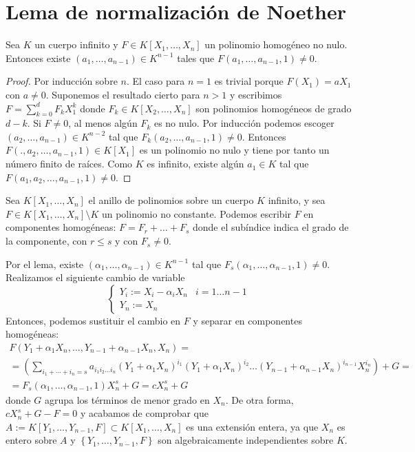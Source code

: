 \documentclass[../main.tex]{subfiles}
\begin{document}
\section{Lema de normalización de Noether}
\begin{lemma}
Sea $K$ un cuerpo infinito y $F\in K[X_1, \dots, X_n]$ un polinomio homogéneo no nulo. Entonces existe $(a_1, \dots, a_{n-1}) \in K^{n-1}$ tales que $F(a_1, \dots, a_{n-1},1)\neq 0$.
\end{lemma}
\begin{proof}
Por inducción sobre $n$. El caso para $n=1$ es trivial porque $F(X_1) = aX_1$ con $a\neq 0$. Suponemos el resultado cierto para $n>1$ y escribimos $F = \sum_{k=0}^d F_k X_1^k$ donde $F_k \in K[X_2,\dots, X_n]$ son polinomios homogéneos de grado $d-k$.  Si $F\neq 0$, al menos algún $F_k$ es no nulo.
Por inducción podemos escoger $(a_2, \dots, a_{n-1}) \in K^{n-2}$ tal que $F_k(a_2, \dots, a_{n-1},1)\neq 0$. Entonces $F(.,a_2, \dots, a_{n-1},1) \in K[X_1]$ es un polinomio no nulo y tiene por tanto un número finito de raíces. Como $K$ es infinito, existe algún $a_1 \in K$ tal que $F(a_1,a_2, \dots, a_{n-1},1) \neq 0$.
\end{proof}
\begin{remark}\label{obs_import}
Sea $K\left[X_{1}, \ldots, X_{n}\right]$ el anillo de polinomios sobre un cuerpo $K$ infinito,  y sea $F \in K\left[X_{1}, \ldots, X_{n}\right] \setminus K$ un polinomio no constante. Podemos escribir $F$ en componentes homogéneas: $F=F_{r}+\ldots+F_{s}$ donde el subíndice indica el grado de la componente, con $r \leq s$ y con $F_{s} \neq 0 .$

Por el lema, existe $\left(\alpha_{1}, \ldots, \alpha_{n-1}\right) \in K^{n-1}$ tal que $F_{s}\left(\alpha_{1}, \ldots, \alpha_{n-1}, 1\right) \neq 0$. Realizamos el siguiente cambio de variable
$$
\begin{cases}
  Y_{i}:=X_{i}-\alpha_{i} X_{n} & i=1 \dots n-1\\
  Y_n := X_n
\end{cases}
$$
Entonces, podemos sustituir el cambio en $F$ y separar en componentes homogéneas:
\begin{multline}
  F\left(Y_{1}+\alpha_{1} X_{n}, \ldots, Y_{n-1}+\alpha_{n-1} X_{n}, X_{n}\right)=\\
  =\left (\sum_{i_{1}+\cdots+i_{n}=s} a_{i_{1} i_{2} \ldots i_{n}}\left(Y_{1}+\alpha_{1} X_{n}\right)^{i_{1}} \left(Y_{1}+\alpha_{1} X_{n}\right)^{i_{2}} \ldots \left(Y_{n-1}+\alpha_{n-1} X_{n}\right)^{i_{n-1}}  X_{n}^{i_{n}} \right )+ G = \\
  =F_{s}\left(\alpha_{1}, \ldots, \alpha_{n-1}, 1\right) X_{n}^{s}+ G = cX_n^s+G
\end{multline}
donde $G$ agrupa los términos de menor grado en $X_n$. De otra forma, $c X_{n}^{s}+ G-F=0$ y acabamos de comprobar que $A:=K\left[Y_{1}, \ldots, Y_{n-1}, F\right] \subset K\left[X_{1}, \ldots, X_{n}\right]$ es una extensión entera, ya que $X_{n}$ es entero sobre $A$ y $\left\{Y_{1}, \ldots, Y_{n-1}, F\right\}$ son algebraicamente independientes sobre $K$.
\end{remark}
\end{document}
